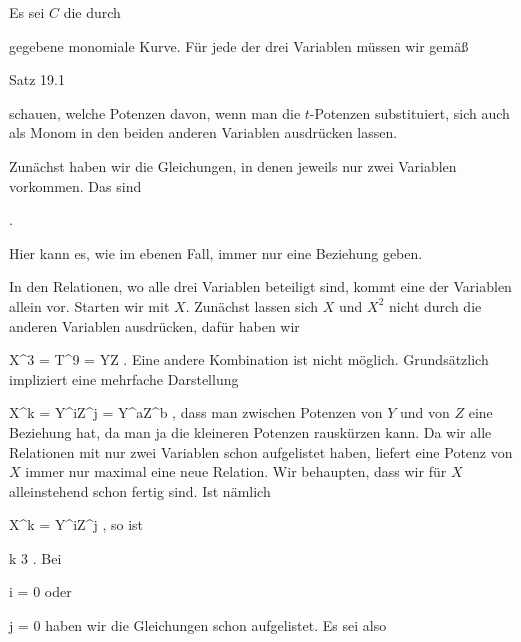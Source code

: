 {





Es sei $C$ die durch

 {  }

gegebene monomiale Kurve. Für jede der drei Variablen müssen wir gemäß

Satz 19.1

schauen, welche Potenzen davon, wenn man die $t$-Potenzen substituiert, sich auch als Monom in den beiden anderen Variablen ausdrücken lassen.

Zunächst haben wir die Gleichungen, in denen jeweils nur zwei Variablen vorkommen. Das sind

 { . }

Hier kann es, wie im ebenen Fall, immer nur eine Beziehung geben.

In den Relationen, wo alle drei Variablen beteiligt sind, kommt eine der Variablen allein vor. Starten wir mit $X$. Zunächst lassen sich $X$ und $X^2$ nicht durch die anderen Variablen ausdrücken, dafür haben wir

\mavergleichskette
{\vergleichskette
{ X^3
}
{ = }{ T^9
}
{ = }{ YZ
}
{    }{
}
{   }{
}
}
{}{}{.}
Eine andere
 {} {}
Kombination ist nicht möglich. Grundsätzlich impliziert eine mehrfache Darstellung

\mavergleichskette
{\vergleichskette
{ X^k
}
{ = }{ Y^{i}Z^{j}
}
{ = }{ Y^{a}Z^{b}
}
{    }{
}
{   }{
}
}
{}{}{,}
dass man zwischen Potenzen von $Y$ und von $Z$ eine Beziehung hat, da man ja die kleineren Potenzen rauskürzen kann. Da wir alle Relationen mit nur zwei Variablen schon aufgelistet haben, liefert eine Potenz von $X$ immer nur maximal eine neue Relation. Wir behaupten, dass wir für $X$ alleinstehend schon fertig sind. Ist nämlich

\mavergleichskette
{\vergleichskette
{ X^k
}
{ = }{ Y^{i}Z^{j}
}
{  }{
}
{    }{
}
{   }{
}
}
{}{}{,}
so ist

\mavergleichskette
{\vergleichskette
{ k
}
{ \geq }{ 3
}
{  }{
}
{    }{
}
{   }{
}
}
{}{}{.}
Bei

\mavergleichskette
{\vergleichskette
{ i
}
{ = }{ 0
}
{  }{
}
{    }{
}
{   }{
}
}
{}{}{}
oder

\mavergleichskette
{\vergleichskette
{ j
}
{ = }{ 0
}
{  }{
}
{    }{
}
{   }{
}
}
{}{}{}
haben wir die Gleichungen schon aufgelistet. Es sei also

}
